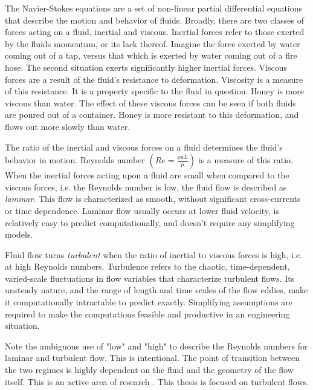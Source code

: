 The Navier-Stokes equations are a set of non-linear partial differential equations that describe the motion and behavior of fluids.
Broadly, there are two classes of forces acting on a fluid, inertial and viscous.
Inertial forces refer to those exerted by the fluids momentum, or its lack thereof.
Imagine the force exerted by water coming out of a tap, versus that which is exerted by water coming out of a fire hose.
The second situation exerts significantly higher inertial forces.
Viscous forces are a result of the fluid's resistance to deformation.
Viscosity is a measure of this resistance.
It is a property specific to the fluid in question.
Honey is more viscous than water.
The effect of these viscous forces can be seen if both fluids are poured out of a container.
Honey is more resistant to this deformation, and flows out more slowly than water.

The ratio of the inertial and viscous forces on a fluid determines the fluid's behavior in motion.
Reynolds number $\left ( Re = \frac{\rho u L}{\mu}\right )$ is a measure of this ratio. When the inertial forces acting upon a fluid are small when compared to the viscous forces, i.e. the Reynolds number is low, the fluid flow is described as \textit{laminar}.
This flow is characterized as smooth, without significant cross-currents or time dependence.
Laminar flow usually occurs at lower fluid velocity, is relatively easy to predict computationally, and doesn't require any simplifying models.

Fluid flow turns \textit{turbulent} when the ratio of inertial to viscous forces is high, i.e. at high Reynolds numbers.
Turbulence refers to the chaotic, time-dependent, varied-scale fluctuations in flow variables that characterize turbulent flows.
Its unsteady nature, and the range of length and time scales of the flow eddies, make it computationally intractable to predict exactly.
Simplifying assumptions are required to make the computations feasible and productive in an engineering situation. 

Note the ambiguous use of "low" and "high" to describe the Reynolds numbers for laminar and turbulent flow.
This is intentional.
The point of transition between the two regimes is highly dependent on the fluid and the geometry of the flow itself.
This is an active area of research \cite{arnal2000laminar}.
This thesis is focused on turbulent flows. 